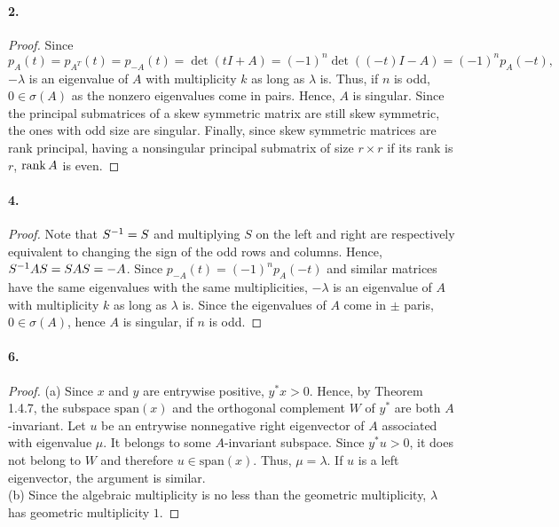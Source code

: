   \paragraph{2.}
  \begin{proof}
    Since
    \[
      p_A(t)=p_{A^T}(t)=p_{-A}(t)=\det(tI+A)=(-1)^n\det((-t)I-A)=(-1)^np_A(-t),
    \]
    $-\lambda$ is an eigenvalue of $A$ with multiplicity $k$ as long as 
    $\lambda$ is. Thus, if $n$ is odd, $0\in\sigma(A)$ as the nonzero eigenvalues 
    come in pairs. Hence, $A$ is singular. Since the principal submatrices of a 
    skew symmetric matrix are still skew symmetric, the ones with odd size are
    singular. Finally, since skew symmetric matrices are rank principal, having
    a nonsingular principal submatrix of size $r\times r$ if its rank is $r$, 
    $\operatorname{rank} A$ is even.
  \end{proof}

  \paragraph{4.}
  \begin{proof}
    Note that $S^{-1} = S$ and multiplying $S$ on the left and right are 
    respectively equivalent to changing the sign of the odd rows and columns.
    Hence, $S^{-1} AS = SAS = -A$. Since $p_{-A}(t)=(-1)^np_A(-t)$ and similar
    matrices have the same eigenvalues with the same multiplicities, $-\lambda$
    is an eigenvalue of $A$ with multiplicity $k$ as long as $\lambda$ is. Since
    the eigenvalues of $A$ come in $\pm$ paris, $0\in\sigma(A)$, hence $A$ is 
    singular, if $n$ is odd.
  \end{proof}

  \paragraph{6.}
  \begin{proof}
    (a) Since $x$ and $y$ are entrywise positive, $y^*x>0$. Hence, by Theorem 
    1.4.7, the subspace $\text{span}(x)$ and the orthogonal complement $W$ of 
    $y^*$ are both $A$-invariant. Let $u$ be an entrywise nonnegative right 
    eigenvector of $A$ associated with eigenvalue $\mu$. It belongs to some 
    $A$-invariant subspace. Since $y^*u>0$, it does not belong to $W$ and 
    therefore $u \in\text{span}(x)$. Thus, $\mu = \lambda$. If $u$ is a left 
    eigenvector, the argument is similar. \\
    (b) Since the algebraic multiplicity is no less than the geometric 
    multiplicity, $\lambda$ has geometric multiplicity $1$.
  \end{proof}

